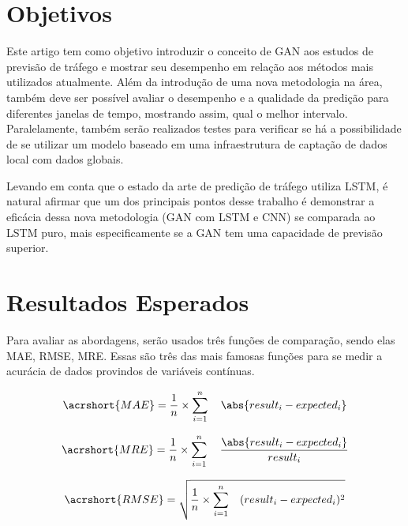 \section{Objetivos}

Este artigo tem como objetivo introduzir o conceito de \acrshort{GAN} aos estudos de previsão de tráfego e mostrar seu desempenho em relação aos métodos mais utilizados atualmente. Além da introdução de uma nova metodologia na área, também deve ser possível avaliar o desempenho e a qualidade da predição para diferentes janelas de tempo, mostrando assim, qual o melhor intervalo. Paralelamente, também serão realizados testes para verificar se há a possibilidade de se utilizar um modelo baseado em uma infraestrutura de captação de dados local com dados globais. 

Levando em conta que o estado da arte de predição de tráfego utiliza \acrshort{LSTM}, é natural afirmar que um dos principais pontos desse trabalho é demonstrar a eficácia dessa nova metodologia (\acrshort{GAN} com \acrshort{LSTM} e \acrshort{CNN}) se comparada ao \acrshort{LSTM} puro, mais especificamente se a \acrshort{GAN} tem uma capacidade de previsão superior.

\section{Resultados Esperados}
Para avaliar as abordagens, serão usados três funções de comparação, sendo elas \acrfull{MAE}, \acrfull{RMSE}, \acrfull{MRE}. Essas são três das mais famosas funções para se medir a acurácia de dados provindos de variáveis contínuas. 


\begin{equation}
\acrshort{MAE} = \frac{1}{n} \times \sum_{i=1}^{n} \quad \abs{result_i - expected_i}
\end{equation}

\begin{equation}
\acrshort{MRE} = \frac{1}{n} \times \sum_{i=1}^{n} \quad \frac{\abs{result_i - expected_i}}{result_i}
\end{equation}

\begin{equation}
\acrshort{RMSE} = \sqrt{ \frac{1}{n} \times \sum_{i=1}^{n} \quad (result_i - expected_i) ^ 2}
\end{equation}


